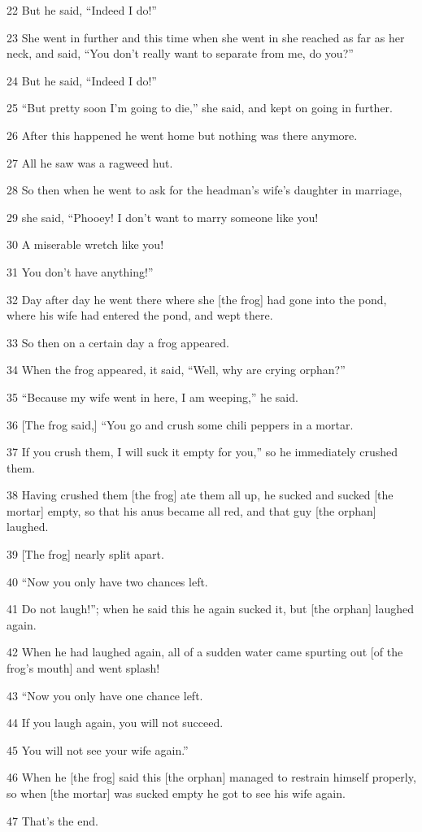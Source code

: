 22 But he said, ``Indeed I do!''

23 She went in further and this time when she went in she reached as far as her
neck, and said, ``You don't really want to separate from me, do you?''

24 But he said, ``Indeed I do!''

25 ``But pretty soon I'm going to die,'' she said, and kept on going in further.

26 After this happened he went home but nothing was there anymore.

27 All he saw was a ragweed hut.

28 So then when he went to ask for the headman's wife's daughter in marriage,

29 she said, ``Phooey! I don't want to marry someone like you!

30 A miserable wretch like you!

31 You don't have anything!''

32 Day after day he went there where she [the frog] had gone into the pond, where
his wife had entered the pond, and wept there.

33 So then on a certain day a frog appeared.

34 When the frog appeared, it said, ``Well, why are crying orphan?''

35 ``Because my wife went in here, I am weeping,'' he said.

36 [The frog said,] ``You go and crush some chili peppers in a mortar.

37 If you crush them, I will suck it empty for you,'' so he immediately crushed
them.

38 Having crushed them [the frog] ate them all up, he sucked and sucked [the mortar]
empty, so that his anus became all red, and that guy [the orphan] laughed.

39 [The frog] nearly split apart.

40 ``Now you only have two chances left.

41 Do not laugh!''; when he said this he again sucked it, but [the orphan] laughed
again.

42 When he had laughed again, all of a sudden water came spurting out [of the frog's
mouth] and went splash!

43 ``Now you only have one chance left.

44 If you laugh again, you will not succeed.

45 You will not see your wife again.''

46 When he [the frog] said this [the orphan] managed to restrain himself properly,
so when [the mortar] was sucked empty he got to see his wife again.

47 That's the end.


